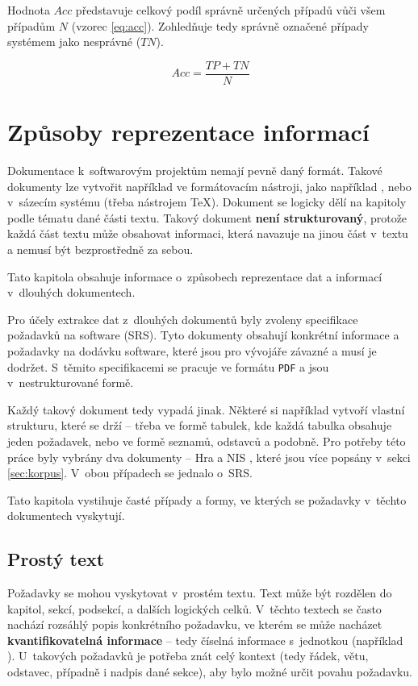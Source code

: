 \documentclass[czech, bc, kiv, he, iso690numb, pdf]{fasthesis}
\begin{document}
Hodnota  $Acc$ představuje celkový podíl správně určených případů vůči všem případům $N$ (vzorec \ref{eq:acc}). Zohledňuje tedy správně označené případy systémem jako nesprávné ($TN$).

\begin{equation}
    \label{eq:acc}
    Acc = \frac{TP + TN}{N}
\end{equation}

\chapter{Způsoby reprezentace informací}\label{chap:reprezentace}
Dokumentace k~softwarovým projektům nemají pevně daný formát. Takové dokumenty lze vytvořit například ve formátovacím nástroji, jako například , nebo v~sázecím systému (třeba nástrojem \TeX{}). Dokument se logicky dělí na kapitoly podle tématu dané části textu. Takový dokument \textbf{není strukturovaný}, protože každá část textu může obsahovat informaci, která navazuje na jinou část v~textu a nemusí být bezprostředně za sebou.

Tato kapitola obsahuje informace o~způsobech reprezentace dat a informací v~dlouhých dokumentech.

Pro účely extrakce dat z~dlouhých dokumentů byly zvoleny specifikace požadavků na software (SRS). Tyto dokumenty obsahují konkrétní informace a požadavky na dodávku software, které jsou pro vývojáře závazné a musí je dodržet. S~těmito specifikacemi se pracuje ve formátu \verb"PDF" a jsou v~nestrukturované formě.

Každý takový dokument tedy vypadá jinak. Některé si například vytvoří vlastní strukturu, které se drží -- třeba ve formě tabulek, kde každá tabulka obsahuje jeden požadavek, nebo ve formě seznamů, odstavců a podobně. Pro potřeby této práce byly vybrány dva dokumenty -- Hra \cite{doc-hra} a NIS \cite{doc-nis}, které jsou více popsány v~sekci \ref{sec:korpus}. V~obou případech se jednalo o~SRS.

Tato kapitola vystihuje časté případy a formy, ve kterých se požadavky v~těchto dokumentech vyskytují.

\section{Prostý text}
Požadavky se mohou vyskytovat v~prostém textu. Text může být rozdělen do kapitol, sekcí, podsekcí, a dalších logických celků. V~těchto textech se často nachází rozsáhlý popis konkrétního požadavku, ve kterém se může nacházet \textbf{kvantifikovatelná informace} -- tedy číselná informace s~jednotkou (například ). U~takových požadavků je potřeba znát celý kontext (tedy řádek, větu, odstavec, případně i nadpis dané sekce), aby bylo možné určit povahu požadavku. 
\end{document}
